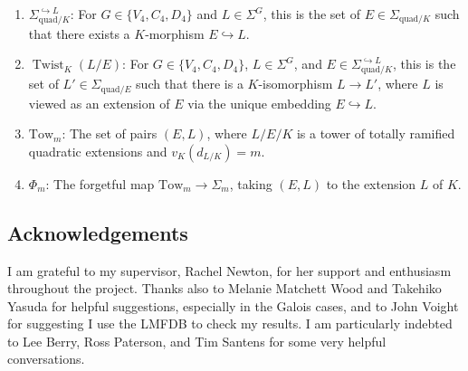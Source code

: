 \documentclass[11pt]{amsart}
\theoremstyle{theorem}
\theoremstyle{example}
\theoremstyle{definition}
\numberwithin{theorem}{section}
\numberwithin{theorem}{section}
\DeclareMathOperator{\Nm}{Nm}
\DeclareMathOperator{\Twist}{Twist}
\newcommand{\co}{\mathcal{O}}
\newcommand{\p}{\mathfrak{p}}
\newcommand{\quadr}{\mathrm{quad}}
\newcommand{\Tow}{\mathrm{Tow}}
\begin{document}
\begin{enumerate}
    \begin{enumerate}
    \item $K(\sqrt{\mathcal{A}}) = K(\{\sqrt{\alpha} : [\alpha] \in \mathcal{A}\})$. 
    \item $\co_K^\mathcal{A} = \co_K^\times \cap \Nm K(\sqrt{\mathcal{A}})$. 
    \item $S_{K/K,t}^\mathcal{A} = S_{K/K,t} \cap \big(\Nm K(\sqrt{\mathcal{A}})/K^{\times 2}\big)$, where $0 \leq t \leq e_K$.
    \item $\Sigma_{\quadr/K, \leq m_1}^\mathcal{A}$ for the set of $E \in \Sigma_{\quadr/K, \leq m_1}$ with $\mathcal{A}\subseteq \Nm E$. 
    \item $(\co_K/\p_K^{2t})^\mathcal{A}$ for the image of the map $\co_K^\mathcal{A} \to (\co_K/\p_K^{2t})^{\times}$.
    \item $\mathcal{A}_t = \mathcal{A} \cap \big(U_K^{(2t)}K^{\times 2} / K^{\times 2}\big)$, where $0 \leq t \leq e_K$. 
    \end{enumerate}
    \item $\Sigma_{\quadr/K}^{\hookrightarrow L}$: For $G\in \{V_4,C_4,D_4\}$ and $L \in \Sigma^G$, this is the set of $E \in \Sigma_{\quadr/K}$ such that there exists a $K$-morphism $E \hookrightarrow L$. 
    \item $\Twist_K(L/E)$: For $G \in \{V_4, C_4, D_4\}$, $L \in \Sigma^G$, and $E \in \Sigma_{\quadr/K}^{\hookrightarrow L}$, this is the set of $L' \in \Sigma_{\quadr/E}$ such that there is a $K$-isomorphism $L\to L'$, where $L$ is viewed as an extension of $E$ via the unique embedding $E\hookrightarrow L$. 
    \item $\Tow_m$: The set of pairs $(E,L)$, where $L/E/K$ is a tower of totally ramified quadratic extensions and $v_K(d_{L/K}) = m$.
    \item $\Phi_m$: The forgetful map $\Tow_m \to \Sigma_m$, taking $(E,L)$ to the extension $L$ of $K$. 
\end{enumerate}

\subsection{Acknowledgements}
I am grateful to my supervisor, Rachel Newton, for her support and enthusiasm throughout the project. Thanks also to Melanie Matchett Wood and Takehiko Yasuda for helpful suggestions, especially in the Galois cases, and to John Voight for suggesting I use the LMFDB to check my results. I am particularly indebted to Lee Berry, Ross Paterson, and Tim Santens for some very helpful conversations. 
\end{document}
